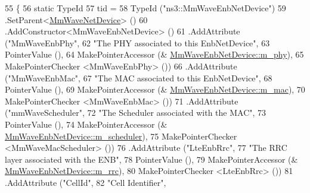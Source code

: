 \begin{DoxyCode}
55 \{
56         \textcolor{keyword}{static} TypeId
57             tid =
58             TypeId (\textcolor{stringliteral}{"ns3::MmWaveEnbNetDevice"})
59             .SetParent<\hyperlink{classns3_1_1MmWaveNetDevice_a554655d89a70a36abe6cf2cb6e44f5ce}{MmWaveNetDevice}> ()
60             .AddConstructor<MmWaveEnbNetDevice> ()
61                 .AddAttribute (\textcolor{stringliteral}{"MmWaveEnbPhy"},
62                                    \textcolor{stringliteral}{"The PHY associated to this EnbNetDevice"},
63                                    PointerValue (),
64                                    MakePointerAccessor (&
      \hyperlink{classns3_1_1MmWaveEnbNetDevice_a42098011e0d238752d0ad74d1bcb17f6}{MmWaveEnbNetDevice::m\_phy}),
65                                MakePointerChecker <MmWaveEnbPhy> ())
66                 .AddAttribute (\textcolor{stringliteral}{"MmWaveEnbMac"},
67                                                    \textcolor{stringliteral}{"The MAC associated to this EnbNetDevice"},
68                                                    PointerValue (),
69                                                    MakePointerAccessor (&
      \hyperlink{classns3_1_1MmWaveEnbNetDevice_aa22ebc9e167c4ee06fbfcb5a1cdf96ad}{MmWaveEnbNetDevice::m\_mac}),
70                                                    MakePointerChecker <MmWaveEnbMac> ())
71                 .AddAttribute (\textcolor{stringliteral}{"mmWaveScheduler"},
72                                                 \textcolor{stringliteral}{"The Scheduler associated with the MAC"},
73                                                 PointerValue (),
74                                             MakePointerAccessor (&
      \hyperlink{classns3_1_1MmWaveEnbNetDevice_a7308e79d47671caa554ac88aaf6603de}{MmWaveEnbNetDevice::m\_scheduler}),
75                                             MakePointerChecker <MmWaveMacScheduler> ())
76                 .AddAttribute (\textcolor{stringliteral}{"LteEnbRrc"},
77                                                 \textcolor{stringliteral}{"The RRC layer associated with the ENB"},
78                                                 PointerValue (),
79                                                 MakePointerAccessor (&
      \hyperlink{classns3_1_1MmWaveEnbNetDevice_ab2f138e7fc0b009e2e2876e271d9a3a4}{MmWaveEnbNetDevice::m\_rrc}),
80                                                 MakePointerChecker <LteEnbRrc> ())
81                 .AddAttribute (\textcolor{stringliteral}{"CellId"},
82                                            \textcolor{stringliteral}{"Cell Identifier"},

\end{DoxyCode}
